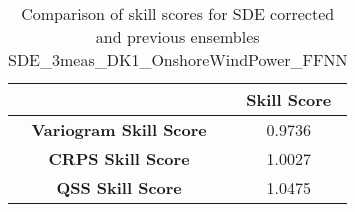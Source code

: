
        \begin{table}[h!]
            \centering
            \begin{tabular}{|c|c|}
                \hline
                & \textbf{Skill Score}  \\
                \hline
                \textbf{Variogram Skill Score} & 0.9736  \\
                \hline
                \textbf{CRPS Skill Score} & 1.0027  \\
                \hline
                \textbf{QSS Skill Score} & 1.0475 \\
                \hline
            \end{tabular}
            \caption{Comparison of skill scores for SDE corrected and previous ensembles SDE_3meas_DK1_OnshoreWindPower_FFNN}
            \label{table:skill_scores_comparison}
        \end{table}
        